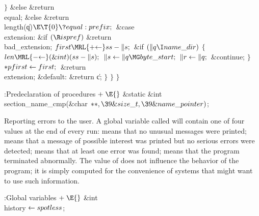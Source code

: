 \4${}\}{}$\2\6
\&{else}\1\5
\&{return} \\{equal};\2\2\6
\&{else}\1\5
\&{return} \\{length}(\|q)${}\E\T{0}\?\\{equal}:\\{prefix};{}$\2\6
\4\&{case} \\{extension}:\6
\&{if} ${}(\R\\{ispref}){}$\1\5
\&{return} \\{bad\_extension};\2\6
${}\\{first}\MRL{+{\K}}\\{ss}-\|s;{}$\6
\&{if} ${}(\|q\I\\{name\_dir}){}$\5
${}\{{}$\1\6
${}\\{len}\MRL{-{\K}}(\&{int})(\\{ss}-\|s);{}$\6
${}\|s\K\|q\MG\\{byte\_start};{}$\6
${}\|r\leftarrow\|q;{}$\6
\&{continue};\6
\4${}\}{}$\2\6
${}{*}\\{pfirst}\leftarrow\\{first};{}$\6
\&{return} \\{extension};\6
\4\&{default}:\5
\&{return} \|c;\6
\4${}\}{}$\2\6
\4${}\}{}$\2\6
\4${}\}{}$\2\par
\fi

\B{}:Predeclaration of procedures\X${}\mathrel+\E{}$\5
\&{static} \&{int} \\{section\_name\_cmp}(\&{char} ${}{*}{*},\39\&{size\_t},\39%
\&{name\_pointer}){}$;\par
\fi

Reporting errors to the user.
A global variable called  will contain one of four values
at the end of every run:  means that no unusual messages were
printed;  means that a message of possible interest
was printed but no serious errors were detected;  means
that
at least one error was found;  means that the program
terminated abnormally. The value of  does not influence the
behavior of the program; it is simply computed for the convenience
of systems that might want to use such information.

\Y\B\4:Global variables\X${}\mathrel+\E{}$\6
\&{int} \\{history}${}\leftarrow\\{spotless}{}$;\par
\fi

